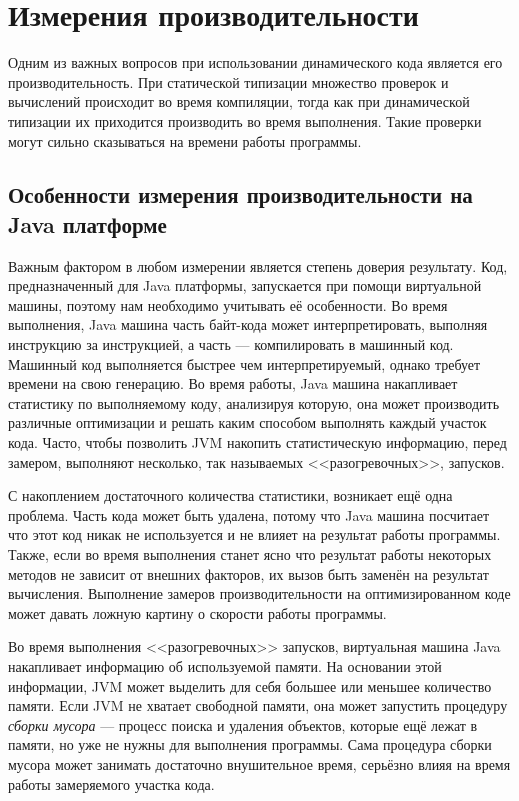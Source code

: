 \section{Измерения производительности}

Одним из важных вопросов при использовании динамического кода является его производительность. При статической типизации множество проверок и вычислений происходит во время компиляции, тогда как при динамической типизации их приходится производить во время выполнения. Такие проверки могут сильно сказываться на времени работы программы.

\subsection{Особенности измерения производительности на Java платформе}

Важным фактором в любом измерении является степень доверия результату. Код, предназначенный для Java платформы, запускается при помощи виртуальной машины, поэтому нам необходимо учитывать её особенности. Во время выполнения, Java машина часть байт-кода может интерпретировать, выполняя инструкцию за инструкцией, а часть --- компилировать в машинный код. Машинный код выполняется быстрее чем интерпретируемый, однако требует времени на свою генерацию. Во время работы, Java машина накапливает статистику по выполняемому коду, анализируя которую, она может производить различные оптимизации и решать каким способом выполнять каждый участок кода. Часто, чтобы позволить JVM накопить статистическую информацию, перед замером, выполняют несколько, так называемых <<разогревочных>>, запусков.

С накоплением достаточного количества статистики, возникает ещё одна проблема. Часть кода может быть удалена, потому что Java машина посчитает что этот код никак не используется и не влияет на результат работы программы. Также, если во время выполнения станет ясно что результат работы некоторых методов не зависит от внешних факторов, их вызов быть заменён на результат вычисления. Выполнение замеров производительности на оптимизированном коде может давать ложную картину о скорости работы программы.

Во время выполнения <<разогревочных>> запусков, виртуальная машина Java накапливает информацию об используемой памяти. На основании этой информации, JVM может выделить для себя большее или меньшее количество памяти. Если JVM не хватает свободной памяти, она может запустить процедуру \textit{сборки мусора} --- процесс поиска и удаления объектов, которые ещё лежат в памяти, но уже не нужны для выполнения программы. Сама процедура сборки мусора может занимать достаточно внушительное время, серьёзно влияя на время работы замеряемого участка кода.

